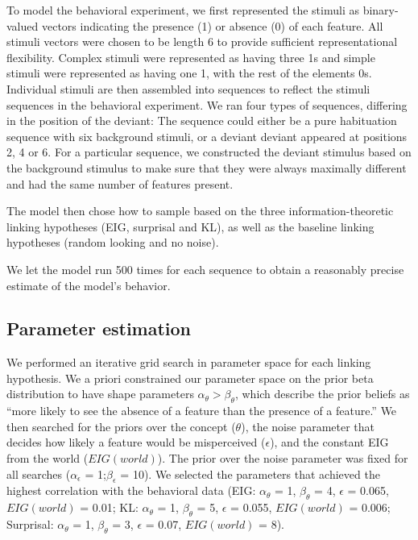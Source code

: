 \documentclass[10pt, letterpaper]{article}
\begin{document}
To model the behavioral experiment, we first represented the stimuli as
binary-valued vectors indicating the presence (1) or absence (0) of each
feature. All stimuli vectors were chosen to be length 6 to provide
sufficient representational flexibility. Complex stimuli were
represented as having three 1s and simple stimuli were represented as
having one 1, with the rest of the elements 0s. Individual stimuli are
then assembled into sequences to reflect the stimuli sequences in the
behavioral experiment. We ran four types of sequences, differing in the
position of the deviant: The sequence could either be a pure habituation
sequence with six background stimuli, or a deviant deviant appeared at
positions 2, 4 or 6. For a particular sequence, we constructed the
deviant stimulus based on the background stimulus to make sure that they
were always maximally different and had the same number of features
present.

The model then chose how to sample based on the three
information-theoretic linking hypotheses (EIG, surprisal and KL), as
well as the baseline linking hypotheses (random looking and no noise).

We let the model run 500 times for each sequence to obtain a reasonably
precise estimate of the model's behavior.

\hypertarget{parameter-estimation}{%
\subsection{Parameter estimation}\label{parameter-estimation}}

We performed an iterative grid search in parameter space for each
linking hypothesis. We a priori constrained our parameter space on the
prior beta distribution to have shape parameters
\(\alpha_{\theta} > \beta_{\theta}\), which describe the prior beliefs
as ``more likely to see the absence of a feature than the presence of a
feature.'' We then searched for the priors over the concept
(\(\theta\)), the noise parameter that decides how likely a feature
would be misperceived (\(\epsilon\)), and the constant EIG from the
world (\(EIG(world)\)). The prior over the noise parameter was fixed for
all searches (\(\alpha_{\epsilon}\) = 1;\(\beta_{\epsilon}\) = 10). We
selected the parameters that achieved the highest correlation with the
behavioral data (EIG: \(\alpha_{\theta}\) = 1, \(\beta_{\theta}\) = 4,
\(\epsilon\) = 0.065, \(EIG(world)\) = 0.01; KL: \(\alpha_{\theta}\) =
1, \(\beta_{\theta}\) = 5, \(\epsilon\) = 0.055, \(EIG(world)\) = 0.006;
Surprisal: \(\alpha_{\theta}\) = 1, \(\beta_{\theta}\) = 3, \(\epsilon\)
= 0.07, \(EIG(world)\) = 8).
\end{document}
